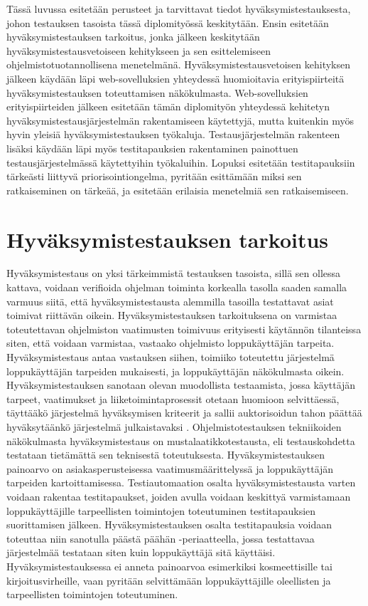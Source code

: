 Tässä luvussa esitetään perusteet ja tarvittavat tiedot hyväksymistestauksesta, johon testauksen tasoista tässä diplomityössä keskitytään.
Ensin esitetään hyväksymistestauksen tarkoitus, jonka jälkeen keskitytään hyväksymistestausvetoiseen kehitykseen ja sen esittelemiseen ohjelmistotuotannollisena menetelmänä.
Hyväksymistestausvetoisen kehityksen jälkeen käydään läpi web-sovelluksien yhteydessä huomioitavia erityispiirteitä hyväksymistestauksen toteuttamisen näkökulmasta.
Web-sovelluksien erityispiirteiden jälkeen esitetään tämän diplomityön yhteydessä kehitetyn hyväksymistestausjärjestelmän rakentamiseen käytettyjä, mutta kuitenkin myös hyvin yleisiä hyväksymistestauksen työkaluja.
Testausjärjestelmän rakenteen lisäksi käydään läpi myös testitapauksien rakentaminen painottuen testausjärjestelmässä käytettyihin työkaluihin.
Lopuksi esitetään testitapauksiin tärkeästi liittyvä priorisointiongelma, pyritään esittämään miksi sen ratkaiseminen on tärkeää, ja esitetään erilaisia menetelmiä sen ratkaisemiseen.

\section{Hyväksymistestauksen tarkoitus} \label{ch:08_hyvaksymistestauksen_tarkoitus}

  Hyväksymistestaus on yksi tärkeimmistä testauksen tasoista, sillä sen ollessa kattava, voidaan verifioida ohjelman toiminta korkealla tasolla saaden samalla varmuus siitä, että hyväksymistestausta alemmilla tasoilla testattavat asiat toimivat riittävän oikein.
  Hyväksymistestauksen tarkoituksena on varmistaa toteutettavan ohjelmiston vaatimusten toimivuus erityisesti käytännön tilanteissa siten, että voidaan varmistaa, vastaako ohjelmisto loppukäyttäjän tarpeita.
  Hyväksymistestaus antaa vastauksen siihen, toimiiko toteutettu järjestelmä loppukäyttäjän tarpeiden mukaisesti, ja loppukäyttäjän näkökulmasta oikein.
  Hyväksymistestauksen sanotaan olevan muodollista testaamista, jossa käyttäjän tarpeet, vaatimukset ja liiketoimintaprosessit otetaan huomioon selvittäessä, täyttääkö järjestelmä hyväksymisen kriteerit ja sallii auktorisoidun tahon päättää hyväksytäänkö järjestelmä julkaistavaksi \cite{istqb_glossary_v3_2}.
  Ohjelmistotestauksen tekniikoiden näkökulmasta hyväksymistestaus on mustalaatikkotestausta, eli testauskohdetta testataan tietämättä sen teknisestä toteutuksesta.
  Hyväksymistestauksen painoarvo on asiakasperusteisessa vaatimusmäärittelyssä ja loppukäyttäjän tarpeiden kartoittamisessa.
  Testiautomaation osalta hyväksymistestausta varten voidaan rakentaa testitapaukset, joiden avulla voidaan keskittyä varmistamaan loppukäyttäjille tarpeellisten toimintojen toteutuminen testitapauksien suorittamisen jälkeen.
  Hyväksymistestauksen osalta testitapauksia voidaan toteuttaa niin sanotulla päästä päähän -periaatteella, jossa testattavaa järjestelmää testataan siten kuin loppukäyttäjä sitä käyttäisi.
  Hyväksymistestauksessa ei anneta painoarvoa esimerkiksi kosmeettisille tai kirjoitusvirheille, vaan pyritään selvittämään loppukäyttäjille oleellisten ja tarpeellisten toimintojen toteutuminen.

